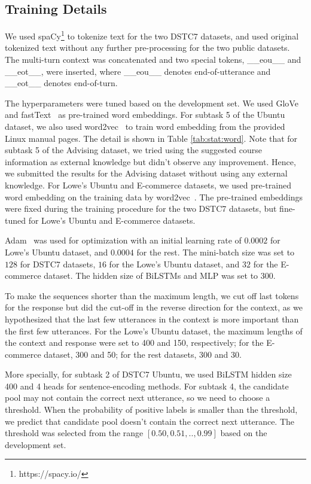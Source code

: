 \documentclass[letterpaper]{article} \usepackage{aaai19}  \usepackage{times}  \usepackage{helvet}  \usepackage{courier}  \usepackage{url}  \usepackage{graphicx}
\begin{document}
\subsection{Training Details}
We used spaCy\footnote{https://spacy.io/} to tokenize text for the two DSTC7 datasets, and used original tokenized text without any further pre-processing for the two public datasets. The multi-turn context was concatenated and two special tokens, \_\_eou\_\_ and \_\_eot\_\_, were inserted, where \_\_eou\_\_ denotes end-of-utterance and \_\_eot\_\_ denotes end-of-turn. 

The hyperparameters were tuned based on the development set.
We used GloVe~\cite{DBLP:conf/emnlp/PenningtonSM14} and fastText~\cite{DBLP:conf/lrec/MikolovGBPJ18} as pre-trained word embeddings. For subtask 5 of the Ubuntu dataset, we also used word2vec~\cite{DBLP:conf/nips/MikolovSCCD13} to train word embedding from the provided Linux manual pages. The detail is shown in Table \ref{tab:stat:word}. 
Note that for subtask 5 of the Advising dataset, we tried using the suggested course information as external knowledge but didn't observe any improvement. Hence, we submitted the results for the Advising dataset without using any external knowledge. 
For Lowe's Ubuntu and E-commerce datasets, we used pre-trained word embedding on the training data by word2vec~\cite{DBLP:conf/nips/MikolovSCCD13}. 
The pre-trained embeddings were fixed during the training procedure for the two DSTC7 datasets, but fine-tuned for Lowe's Ubuntu and E-commerce datasets. 

Adam~\cite{DBLP:journals/corr/KingmaB14} was used for optimization with an initial learning rate of $0.0002$ for Lowe's Ubuntu dataset, and $0.0004$ for the rest. The mini-batch size was set to $128$ for DSTC7 datasets, $16$ for the Lowe's Ubuntu dataset, and $32$ for the E-commerce dataset. The hidden size of BiLSTMs and MLP was set to 300.

To make the sequences shorter than the maximum length, we cut off last tokens for the response but did the cut-off in the reverse direction for the context, as we hypothesized that the last few utterances in the context is more important than the first few utterances.
For the Lowe's Ubuntu dataset, the maximum lengths of the context and response were set to 400 and 150, respectively; for the E-commerce dataset, 300 and 50; for the rest datasets, 300 and 30. 

More specially, for subtask 2 of DSTC7 Ubuntu, we used BiLSTM hidden size 400 and 4 heads for sentence-encoding methods. For subtask 4, the candidate pool may not contain the correct next utterance, so we need to choose a threshold. When the probability of positive labels is smaller than the threshold, we predict that candidate pool doesn't contain the correct next utterance. The threshold was selected from the range $[0.50,0.51,..,0.99]$ based on the development set. 
\end{document}
